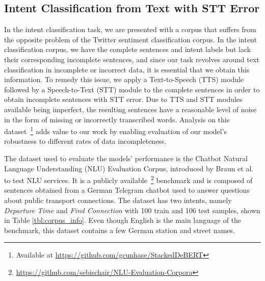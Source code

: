 \documentclass[review]{elsarticle}
\begin{document}
\begin{table}[ht!]
 \caption{Details about our Twitter Sentiment Classification dataset, composed of incorrect and correct data.}
 \label{tbl:corpus_info_twitter}
 \bigskip
 \centering
\end{table}


\subsection{Intent Classification from Text with STT Error}

In the intent classification task, we are presented with a corpus that suffers from the opposite problem of the Twitter sentiment classification corpus. In the intent classification corpus, we have the complete sentences and intent labels but lack their corresponding incomplete sentences, and since our task revolves around text classification in incomplete or incorrect data, it is essential that we obtain this information. To remedy this issue, we apply a Text-to-Speech (TTS) module followed by a Speech-to-Text (STT) module to the complete sentences in order to obtain incomplete sentences with STT error. Due to TTS and STT modules available being imperfect, the resulting sentences have a reasonable level of noise in the form of missing or incorrectly transcribed words. Analysis on this dataset~\footnote{Available at \url{https://github.com/gcunhase/StackedDeBERT}} adds value to our work by enabling evaluation of our model's robustness to different rates of data incompleteness.

The dataset used to evaluate the models' performance is the Chatbot Natural Language Understanding (NLU) Evaluation Corpus, introduced by Braun et al.~\cite{braun2017evaluating} to test NLU services. It is a publicly available~\footnote{\url{https://github.com/sebischair/NLU-Evaluation-Corpora}} benchmark and is composed of sentences obtained from a German Telegram chatbot used to answer questions about public transport connections. The dataset has two intents, namely \textit{Departure Time} and \textit{Find Connection} with 100 train and 106 test samples, shown in Table \ref{tbl:corpus_info}. Even though English is the main language of the benchmark, this dataset contains a few German station and street names.
\end{document}
